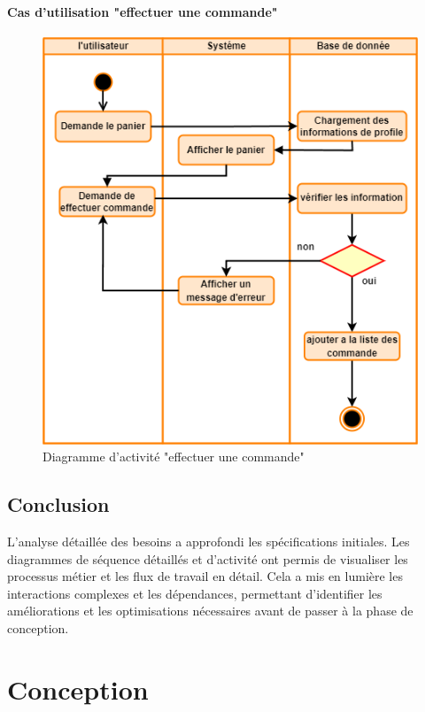 \documentclass[edit,12pt,a4paper,ChapStyle,oneside,doubleinterligne]{report}
\begin{document}
\subsubsection{Cas d'utilisation "effectuer une commande"}
\begin{figure}[h!]\label{fig:activite }
    \centering
    \includegraphics[width=1\textwidth]{images/activite effecter commande.png}
    \caption{Diagramme d'activité "effectuer une commande"}
\end{figure}
\section{Conclusion}
L'analyse détaillée des besoins a approfondi les spécifications initiales. Les diagrammes de séquence détaillés et d'activité ont permis de visualiser les processus métier et les flux de travail en détail. Cela a mis en lumière les interactions complexes et les dépendances, permettant d'identifier les améliorations et les optimisations nécessaires avant de passer à la phase de conception.






\chapter{Conception}
\end{document}

